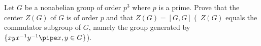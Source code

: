 Let $G$ be a nonabelian group of order $p^3$ where $p$ is a
prime. Prove that the center $Z(G)$ of $G$ is of order $p$ and that
$Z(G)=[G,G]$ (\ie\ $Z(G)$ equals the commutator subgroup of $G$,
namely the group generated by $\{xyx^{-1}y^{-1} \pipe x,y\in G\}$).
